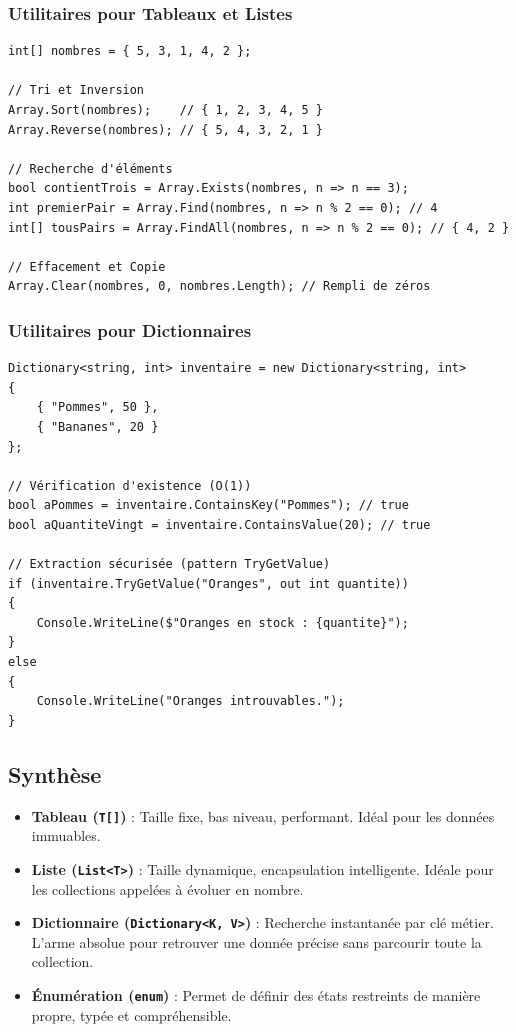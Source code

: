 \subsubsection{Utilitaires pour Tableaux et Listes}
\begin{lstlisting}[style=csharpstyle]
int[] nombres = { 5, 3, 1, 4, 2 };

// Tri et Inversion
Array.Sort(nombres);    // { 1, 2, 3, 4, 5 }
Array.Reverse(nombres); // { 5, 4, 3, 2, 1 }

// Recherche d'éléments
bool contientTrois = Array.Exists(nombres, n => n == 3);
int premierPair = Array.Find(nombres, n => n % 2 == 0); // 4
int[] tousPairs = Array.FindAll(nombres, n => n % 2 == 0); // { 4, 2 }

// Effacement et Copie
Array.Clear(nombres, 0, nombres.Length); // Rempli de zéros
\end{lstlisting}

\subsubsection{Utilitaires pour Dictionnaires}
\begin{lstlisting}[style=csharpstyle]
Dictionary<string, int> inventaire = new Dictionary<string, int>
{
    { "Pommes", 50 },
    { "Bananes", 20 }
};

// Vérification d'existence (O(1))
bool aPommes = inventaire.ContainsKey("Pommes"); // true
bool aQuantiteVingt = inventaire.ContainsValue(20); // true

// Extraction sécurisée (pattern TryGetValue)
if (inventaire.TryGetValue("Oranges", out int quantite))
{
    Console.WriteLine($"Oranges en stock : {quantite}");
}
else
{
    Console.WriteLine("Oranges introuvables.");
}
\end{lstlisting}

\subsection{Synthèse}
\begin{itemize}
    \item \textbf{Tableau (\texttt{T[]})} : Taille fixe, bas niveau, performant. Idéal pour les données immuables.
    \item \textbf{Liste (\texttt{List<T>})} : Taille dynamique, encapsulation intelligente. Idéale pour les collections appelées à évoluer en nombre.
    \item \textbf{Dictionnaire (\texttt{Dictionary<K, V>})} : Recherche instantanée par clé métier. L'arme absolue pour retrouver une donnée précise sans parcourir toute la collection.
    \item \textbf{Énumération (\texttt{enum})} : Permet de définir des états restreints de manière propre, typée et compréhensible.
\end{itemize}
